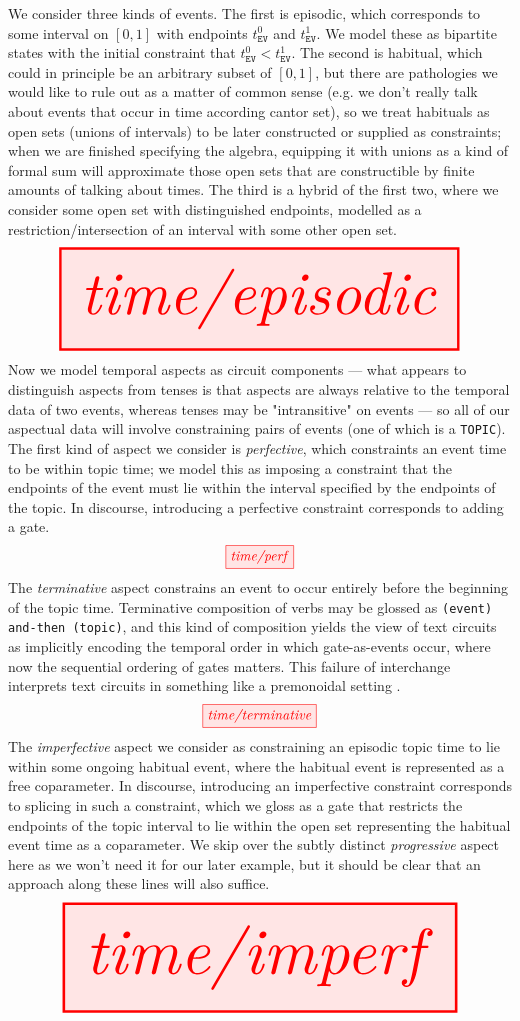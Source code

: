 \begin{defn}
We consider three kinds of events. The first is episodic, which corresponds to some interval on $[0,1]$ with endpoints $t_{\texttt{EV}}^0$ and $t_{\texttt{EV}}^1$. We model these as bipartite states with the initial constraint that $t_{\texttt{EV}}^0 < t_{\texttt{EV}}^1$. The second is habitual, which could in principle be an arbitrary subset of $[0,1]$, but there are pathologies we would like to rule out as a matter of common sense (e.g. we don't really talk about events that occur in time according cantor set), so we treat habituals as open sets (unions of intervals) to be later constructed or supplied as constraints; when we are finished specifying the algebra, equipping it with unions as a kind of formal sum will approximate those open sets that are constructible by finite amounts of talking about times. The third is a hybrid of the first two, where we consider some open set with distinguished endpoints, modelled as a restriction/intersection of an interval with some other open set.
\[\resizebox{\textwidth}{!}{\tikzfig{time/episodic}}\]
Now we model temporal aspects as circuit components --- what appears to distinguish aspects from tenses is that aspects are always relative to the temporal data of two events, whereas tenses may be "intransitive" on events --- so all of our aspectual data will involve constraining pairs of events (one of which is a \texttt{TOPIC}). The first kind of aspect we consider is \emph{perfective}, which constraints an event time to be within topic time; we model this as imposing a constraint that the endpoints of the event must lie within the interval specified by the endpoints of the topic. In discourse, introducing a perfective constraint corresponds to adding a gate.
\[\tikzfig{time/perf}\]
The \emph{terminative} aspect constrains an event to occur entirely before the beginning of the topic time. Terminative composition of verbs may be glossed as \texttt{(event) and-then (topic)}, and this kind of composition yields the view of text circuits as implicitly encoding the temporal order in which gate-as-events occur, where now the sequential ordering of gates matters. This failure of interchange interprets text circuits in something like a premonoidal setting \citep{jeffreyPremonoidalCategoriesFlow1998,romanStringDiagramsPremonoidal2024}.
\[\tikzfig{time/terminative}\]
The \emph{imperfective} aspect we consider as constraining an episodic topic time to lie within some ongoing habitual event, where the habitual event is represented as a free coparameter. In discourse, introducing an imperfective constraint corresponds to splicing in such a constraint, which we gloss as a gate that restricts the endpoints of the topic interval to lie within the open set representing the habitual event time as a coparameter. We skip over the subtly distinct \emph{progressive} aspect here as we won't need it for our later example, but it should be clear that an approach along these lines will also suffice.
\[\resizebox{\textwidth}{!}{\tikzfig{time/imperf}}\]
\end{defn}

